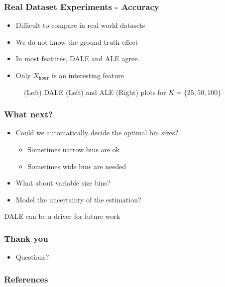 \documentclass{beamer}
\begin{document}
\begin{frame}
  \frametitle{Real Dataset Experiments - Accuracy}
  \begin{itemize}
  \item Difficult to compare in real world datasets
   \item We do not know the ground-truth effect
   \item In most features, DALE and ALE agree.
   \item Only \(X_{\mathtt{hour}}\) is an interesting feature
  \end{itemize}

  \begin{figure}[h]
  \centering
    \resizebox{.3\columnwidth}{!}{}
    \resizebox{.3\columnwidth}{!}{}
    \caption{(Left) DALE (Left) and ALE (Right) plots for
      \(K = \{25, 50, 100\}\)}
\end{figure}

\end{frame}

\begin{frame}
  \frametitle{What next?}
  \begin{itemize}
  \item Could we automatically decide the optimal bin sizes?
    \begin{itemize}
      \item Sometimes narrow bins are ok
      \item Sometimes wide bins are needed
      \end{itemize}
    \item What about variable size bins?
      \item Model the uncertainty of the estimation?
  \end{itemize}

  \noindent\makebox[\linewidth]{\rule{\paperwidth}{0.4pt}}
  DALE can be a driver for future work
\end{frame}


\begin{frame}
  \frametitle{Thank you}
  \begin{itemize}
  \item Questions?
  \end{itemize}

\end{frame}



\begin{frame}[allowframebreaks]
  \frametitle{References}
  \printbibliography
\end{frame}
\end{document}
